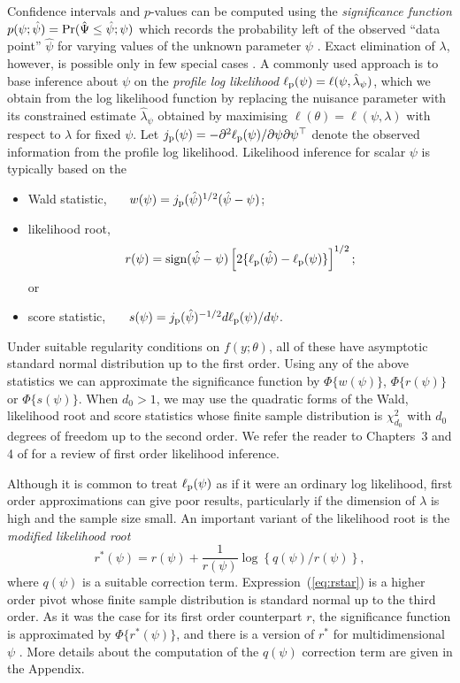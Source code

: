 \documentclass[a4paper,11pt]{article}
\begin{document}
Confidence intervals and $p$-values can be computed using the \emph{significance function} $p(\psi;\hat\psi) = {\rm Pr}(\hat\Psi \leq \hat\psi;\psi)$ which records the probability left of the observed ``data point'' $\hat\psi$ for varying values of the unknown parameter $\psi$ \citep{fraser:1991}.  Exact elimination of $\lambda$, however, is possible only in few special cases \citep[Sections~8.2 and 8.3]{severini:2000}.  A commonly used approach is to base inference about $\psi$ on the \emph{profile log likelihood} $\ell_{\rm p}(\psi) = \ell(\psi,\hat\lambda_\psi)$, which we obtain from the log likelihood function by replacing the nuisance parameter with its constrained estimate $\hat\lambda_\psi$ obtained by maximising $\ell(\theta) = \ell(\psi,\lambda)$ with respect to $\lambda$ for fixed $\psi$.  Let $j_{\rm p}(\psi)=-\partial^2\ell_{\rm p}(\psi)/\partial\psi\partial\psi^\top$ denote the observed information from the profile log likelihood.  Likelihood inference for scalar $\psi$ is typically based on the 
%
\begin{itemize}
\item Wald statistic, \ \ \ $w(\psi)  =  j_{\rm p}(\hat\psi)^{1/2}(\hat\psi - \psi)$; 
\item likelihood root, 
      \[
      r(\psi)  =  {\rm sign}(\hat\psi - \psi)\left[2\{\ell_{\rm p}(\hat\psi) -  \ell_{\rm p}(\psi)\}\right]^{1/2}; 
      \]
      or
\item score statistic, \ \ \ $s(\psi)  =  j_{\rm p}(\hat\psi)^{-1/2}d\ell_{\rm p}(\psi)/d\psi$.
\end{itemize}
Under suitable regularity conditions on $f(y;\theta)$, all of these have asymptotic standard normal distribution up to the first order.  Using any of the above statistics we can approximate the significance function by $\Phi\{w(\psi)\}$, $\Phi\{r(\psi)\}$ or $\Phi\{s(\psi)\}$.  When $d_0 > 1$, we may use the quadratic forms of the Wald, likelihood root and score statistics whose finite sample distribution is $\chi^2_{d_0}$ with $d_0$ degrees of freedom up to the second order.  We refer the reader to Chapters~3 and 4 of \citet{severini:2000} for a review of first order likelihood inference.
 
Although it is common to treat $\ell_{\rm p}(\psi)$ as if it were an  ordinary log likelihood, first order approximations can give poor results, particularly if the dimension of $\lambda$ is high and the sample size small.  An important variant of the likelihood root is the \emph{modified likelihood root}
%
\begin{equation}
\label{eq:rstar}
r^*(\psi) = r(\psi) + \frac{1}{r(\psi)}\log\left\{q(\psi)/r(\psi)\right\},
\end{equation}
%
where $q(\psi)$ is a suitable correction term.  Expression~(\ref{eq:rstar}) is a higher order pivot whose finite sample distribution is standard normal up to the third order.  As it was the case for its first order counterpart $r$, the significance function is approximated by $\Phi\{r^*(\psi)\}$, and there is a version of $r^*$ for multidimensional $\psi$ \citep[Section~3.1]{skovgaard:2001}.  More details about the computation of the $q(\psi)$ correction term are given in the Appendix.    
\end{document}

